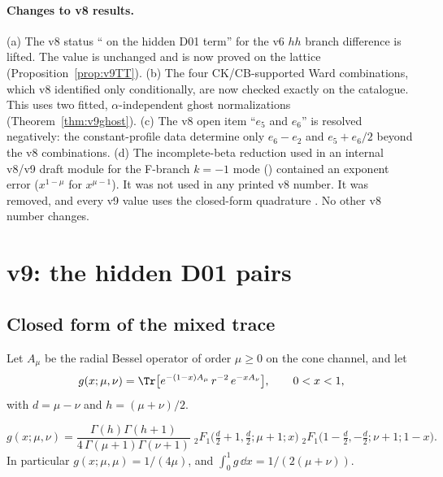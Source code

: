 \paragraph{Changes to v8 results.}
(a) The v8 status ``\CONDITIONAL{} on the hidden D01 term'' for the v6
\(hh\) branch difference is lifted. The value is unchanged and is
now proved on the lattice (Proposition~\ref{prop:v9TT}).
(b) The four CK/CB-supported Ward combinations, which v8
identified only conditionally, are now checked exactly on the
catalogue. This uses two fitted, \(\alpha\)-independent ghost
normalizations (Theorem~\ref{thm:v9ghost}).
(c) The v8 open item ``\(e_5\) and \(e_6\)'' is resolved negatively:
the constant-profile data determine only \(e_6-e_2\) and
\(e_5+e_6/2\) beyond the v8 combinations.
(d) The incomplete-beta reduction used in an internal v8/v9 draft
module for the F-branch \(k=-1\) mode () contained an
exponent error (\(x^{1-\mu}\) for \(x^{\mu-1}\)). It was not used
in any printed v8 number. It was removed, and every v9 value uses
the closed-form quadrature .
No other v8 number changes.

\section{v9: the hidden D01 pairs}
\label{sec:v9hidden}

\subsection{Closed form of the mixed trace}

Let \(A_\mu\) be the radial Bessel operator of order \(\mu\ge0\) on
the cone channel, and let
\[
 g(x;\mu,\nu)=\Tr\bigl[e^{-(1-x)A_\mu}\,r^{-2}\,e^{-xA_\nu}\bigr],
 \qquad 0<x<1,
\]
with \(d=\mu-\nu\) and \(h=(\mu+\nu)/2\).

\begin{proposition}
\label{prop:v9g}
\[
 g(x;\mu,\nu)=\frac{\Gamma(h)\Gamma(h+1)}{4\,\Gamma(\mu+1)\Gamma(\nu+1)}\;
 {}_2F_1\!\bigl(\tfrac d2+1,\tfrac d2;\mu+1;x\bigr)\;
 {}_2F_1\!\bigl(1-\tfrac d2,-\tfrac d2;\nu+1;1-x\bigr).
\]
In particular \(g(x;\mu,\mu)=1/(4\mu)\), and
\(\int_0^1g\,\dd x=1/(2(\mu+\nu))\).
\end{proposition}

